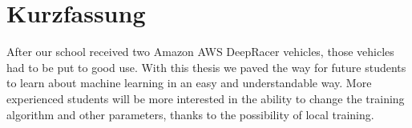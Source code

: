 \chapter{Kurzfassung}

%
%
%
%

After our school received two Amazon AWS DeepRacer vehicles, those vehicles had to be put to good use. With this thesis we paved the way for future students to learn about machine learning in an easy and understandable way. More experienced students will be more interested in the ability to change the training algorithm and other parameters, thanks to the possibility of local training. 
